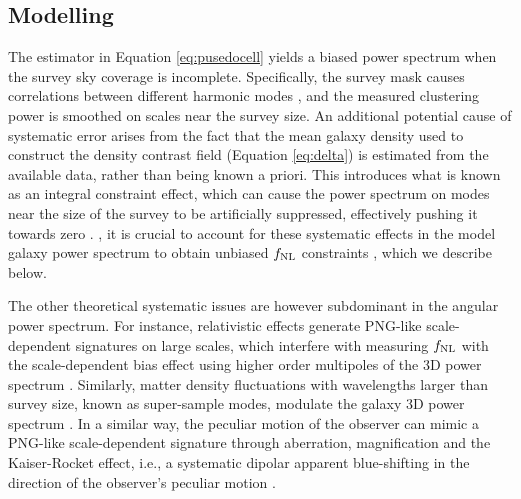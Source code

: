 \subsection{Modelling}
The estimator in Equation \ref{eq:pusedocell} yields a biased power spectrum when the survey sky coverage is incomplete. Specifically, the survey mask causes correlations between different harmonic modes \citep{beutler2014clustering,wilson2017rapid}, and the measured clustering power is smoothed on scales near the survey size. An additional potential cause of systematic error arises from the fact that the mean galaxy density used to construct the density contrast field (Equation \ref{eq:delta}) is estimated from the available data, rather than being known a priori. This introduces what is known as an integral constraint effect, which can cause the power spectrum on modes near the size of the survey to be artificially suppressed, effectively pushing it towards zero \citep{peacock1991large,de2019integral}. , it is crucial to account for these systematic effects in the model galaxy power spectrum to obtain unbiased $f_{\rm NL}$ constraints \citep[see, also,][]{riquelme2022primordial}, which we describe below.
  
The other theoretical systematic issues are however subdominant in the angular power spectrum. For instance, relativistic effects generate PNG-like scale-dependent signatures on large scales, which interfere with measuring $f_{\rm NL}$ with the scale-dependent bias effect using higher order multipoles of the 3D power spectrum \citep{wang2020}. Similarly, matter density fluctuations with wavelengths larger than survey size, known as super-sample modes, modulate the galaxy 3D power spectrum \citep{castorina2020JCAP}. In a similar way, the peculiar motion of the observer can mimic a PNG-like scale-dependent signature through aberration, magnification and the Kaiser-Rocket effect, i.e., a systematic dipolar apparent blue-shifting in the direction of the observer's peculiar motion \citep{2021JCAP...11..027B}.
  
